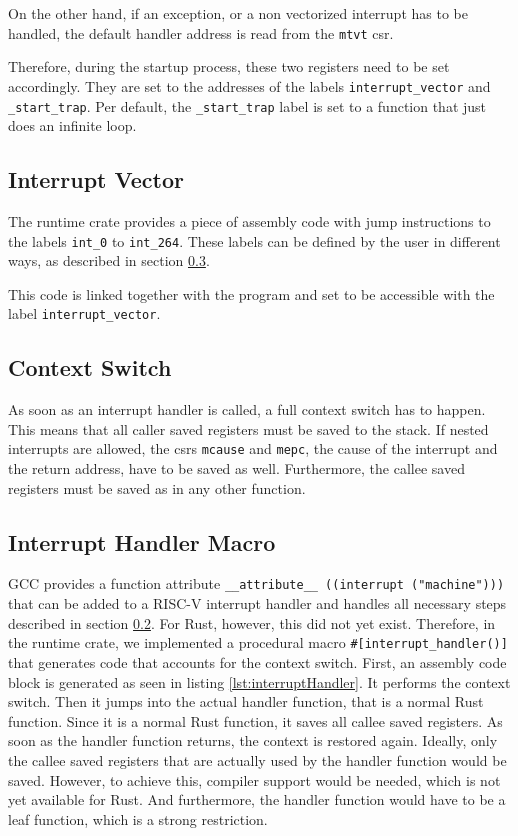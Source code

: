 On the other hand, if an exception, or a non vectorized interrupt has to be handled, the default handler address is read from the \texttt{mtvt} \gls{csr}.

Therefore, during the startup process, these two registers need to be set accordingly. They are set to the addresses of the labels \texttt{interrupt_vector} and \texttt{_start_trap}. Per default, the \texttt{_start_trap} label is set to a function that just does an infinite loop.

\subsection{Interrupt Vector}
\label{sec:vector_table}
The runtime crate provides a piece of assembly code with jump instructions to the labels \texttt{int_0} to \texttt{int_264}. These labels can be defined by the user in different ways, as described in section \ref{sec:interrupt_handler_macro}.

 This code is linked together with the program and set to be accessible with the label \texttt{interrupt_vector}.

\subsection{Context Switch}
\label{sec:context_switch}
As soon as an interrupt handler is called, a full context switch has to happen. This means that all caller saved registers must be saved to the stack. If nested interrupts are allowed, the \gls{csr}s \texttt{mcause} and \texttt{mepc}, the cause of the interrupt and the return address, have to be saved as well. Furthermore, the callee saved registers must be saved as in any other function.

\subsection{Interrupt Handler Macro}
\label{sec:interrupt_handler_macro}
GCC provides a function attribute \texttt{__attribute__ ((interrupt ("machine")))} that can be added to a RISC-V interrupt handler and handles all necessary steps described in section \ref{sec:context_switch}. For Rust, however, this did not yet exist. Therefore, in the runtime crate, we implemented a procedural macro \texttt{\#[interrupt_handler()]} that generates code that accounts for the context switch.
First, an assembly code block is generated as seen in listing \ref{lst:interruptHandler}.
It performs the context switch. Then it jumps into the actual handler function, that is a normal Rust function. Since it is a normal Rust function, it saves all callee saved registers.
As soon as the handler function returns, the context is restored again.
Ideally, only the callee saved registers that are actually used by the handler function would be saved. However, to achieve this, compiler support would be needed, which is not yet available for Rust. And furthermore, the handler function would have to be a leaf function, which is a strong restriction.

